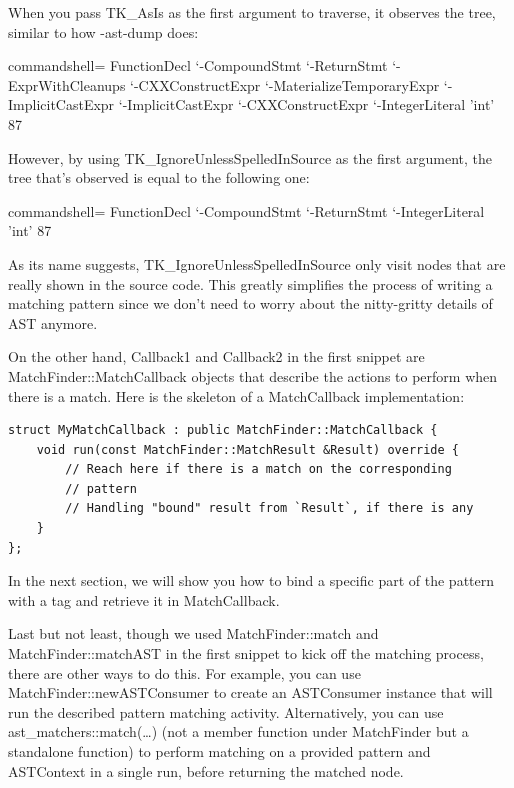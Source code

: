 When you pass TK\_AsIs as the first argument to traverse, it observes the tree, similar to how -ast-dump does:

\begin{tcblisting}{commandshell={}}
FunctionDecl
`-CompoundStmt
  `-ReturnStmt
    `-ExprWithCleanups
      `-CXXConstructExpr
        `-MaterializeTemporaryExpr
          `-ImplicitCastExpr
            `-ImplicitCastExpr
              `-CXXConstructExpr
                `-IntegerLiteral 'int' 87
\end{tcblisting}

However, by using TK\_IgnoreUnlessSpelledInSource as the first argument, the tree that's observed is equal to the following one:

\begin{tcblisting}{commandshell={}}
FunctionDecl
`-CompoundStmt
  `-ReturnStmt
    `-IntegerLiteral 'int' 87
\end{tcblisting}

As its name suggests, TK\_IgnoreUnlessSpelledInSource only visit nodes that are really shown in the source code. This greatly simplifies the process of writing a matching pattern since we don't need to worry about the nitty-gritty details of AST anymore.

On the other hand, Callback1 and Callback2 in the first snippet are MatchFinder::MatchCallback objects that describe the actions to perform when there is a match. Here is the skeleton of a MatchCallback implementation:

\begin{lstlisting}[style=styleCXX]
struct MyMatchCallback : public MatchFinder::MatchCallback {
	void run(const MatchFinder::MatchResult &Result) override {
		// Reach here if there is a match on the corresponding
		// pattern
		// Handling "bound" result from `Result`, if there is any
	}
};
\end{lstlisting}

In the next section, we will show you how to bind a specific part of the pattern with a tag and retrieve it in MatchCallback.

Last but not least, though we used MatchFinder::match and MatchFinder::matchAST in the first snippet to kick off the matching process, there are other ways to do this. For example, you can use MatchFinder::newASTConsumer to create an ASTConsumer instance that will run the described pattern matching activity. Alternatively, you can use ast\_matchers::match(…) (not a member function under MatchFinder but a standalone function) to perform matching on a provided pattern and ASTContext in a single run, before returning the matched node.


